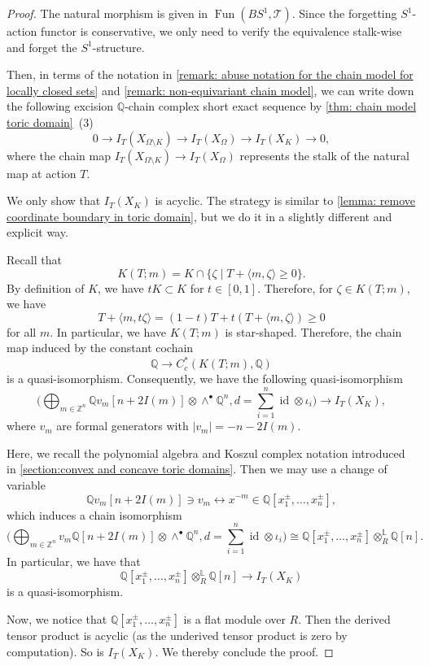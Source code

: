 \documentclass[11pt]{amsart}
\numberwithin{equation}{section}
\theoremstyle{plain}
\theoremstyle{definition}
\theoremstyle{remark}
\newcommand{\bQ} { {\mathbb{Q}}}
\newcommand{\bZ} { {\mathbb{Z}}}
\newcommand{\sT} { {\mathscr{T}}}
\newcommand{\id}{{\operatorname{id}}}
\newcommand\Fun{\operatorname{Fun}}
\begin{document}
\begin{proof} The natural morphism is given in $\Fun(BS^1,\sT)$. Since the forgetting $S^1$-action functor is conservative, we only need to verify the equivalence stalk-wise and forget the $S^1$-structure.

Then, in terms of the notation in \autoref{remark: abuse notation for the chain model for locally closed sets} and \autoref{remark: non-equivariant chain model}, we can write down the following excision $\bQ$-chain complex short exact sequence by \autoref{thm: chain model toric domain}~(3)
\[0\to I_{T}(X_{\Omega\setminus K})\to I_{T}(X_{\Omega }) \to I_{T}(X_{K}) \to 0,\]
where the chain map $I_{T}(X_{\Omega\setminus K})\to I_{T}(X_{\Omega })$ represents the stalk of the natural map at action $T$.

We only show that $I_{T}(X_{K}) $ is acyclic. The strategy is similar to \autoref{lemma: remove coordinate boundary in toric domain}, but we do it in a slightly different and explicit way.

Recall that 
\[K(T;m)=K\cap \{\zeta\mid T+\langle m,\zeta\rangle\geq 0\}.\]
By definition of $K$, we have $tK\subset K$ for $t\in [0,1]$. Therefore, for $\zeta\in K(T;m)$, we have
\[T+\langle m,t\zeta\rangle=(1-t)T+t(T+\langle m,\zeta\rangle) \geq 0\]
for all $m$. In particular, we have $K(T;m)$ is star-shaped. Therefore, the chain map induced by the constant cochain 
\[\bQ \to C^*_c(K(T;m),\bQ)\]
is a quasi-isomorphism. 
Consequently, we have the following quasi-isomorphism 
\[\Big(\bigoplus_{m\in\bZ^n} \bQ v_m[n+2I(m)]\otimes \wedge^\bullet\bQ^n,d=\sum_{i=1}^n \id\otimes \iota_i \Big)\to I_{T}(X_{K}),\]
where $v_m$ are formal generators with $|v_m|=-n-2I(m)$.

Here, we recall the polynomial algebra and Koszul complex notation introduced in \autoref{section:convex and concave toric domains}.
Then we may use a change of variable
\[  \bQ v_m[n+2I(m)]  \ni v_m\leftrightarrow x^{-m} \in \bQ[x_1^\pm,\dots,x_n^\pm],\]
which induces a chain isomorphism
\[\Big(\bigoplus_{m\in\bZ^n} v_m\bQ[n+2I(m)]\otimes \wedge^\bullet\bQ^n,d=\sum_{i=1}^n \id\otimes \iota_i \Big)\cong \bQ[x_1^\pm,\dots,x_n^\pm]\otimes_{R}^{\mathbb{L}}\bQ[n].\]
In particular, we have that 
\[\bQ[x_1^\pm,\dots,x_n^\pm]\otimes_{R}^{\mathbb{L}}\bQ [n]\to I_{T}(X_{K})\]
is a quasi-isomorphism.

Now, we notice that $\bQ[x_1^\pm,\dots,x_n^\pm]$ is a flat module over $R$. Then the derived tensor product is acyclic (as the underived tensor product is zero by computation). So is $I_{T}(X_{K})$. We thereby conclude the proof.
\end{proof}
\end{document}
